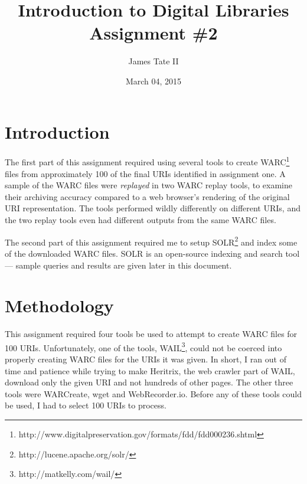 \documentclass[a4paper,12pt]{article}
\begin{document}
\renewcommand{\thelstlisting}{\thesection-\arabic{lstlisting}}
\setlength{\floatsep}{0pt plus 2pt minus 2pt}

\title{Introduction to Digital Libraries Assignment \#2}
\date{March 04, 2015}
\author{James Tate II}
\maketitle

\section{Introduction}
The first part of this assignment required using several tools to create
WARC\footnote{http://www.digitalpreservation.gov/formats/fdd/fdd000236.shtml} files from approximately 100
of the final URIs identified in assignment one. A sample of the WARC files were \emph{replayed} in two WARC
replay tools, to examine their archiving accuracy compared to a web browser's rendering of the original URI
representation. The tools performed wildly differently on different URIs, and the two replay tools even
had different outputs from the same WARC files.

The second part of this assignment required me to setup SOLR\footnote{http://lucene.apache.org/solr/} and
index some of the downloaded WARC files. SOLR is an open-source indexing and search tool --- sample
queries and results are given later in this document.

\section{Methodology}
This assignment required four tools be used to attempt to create WARC files for 100 URIs. Unfortunately, one
of the tools, WAIL\footnote{http://matkelly.com/wail/}, could not be coerced into properly creating WARC
files for the URIs it was given. In short, I ran out of time and patience while trying to make Heritrix, the
web crawler part of WAIL, download only the given URI and not hundreds of other pages. The other three tools
were WARCreate, wget and WebRecorder.io. Before any of these tools could be used, I had to select 
100 URIs to process.
\end{document}
